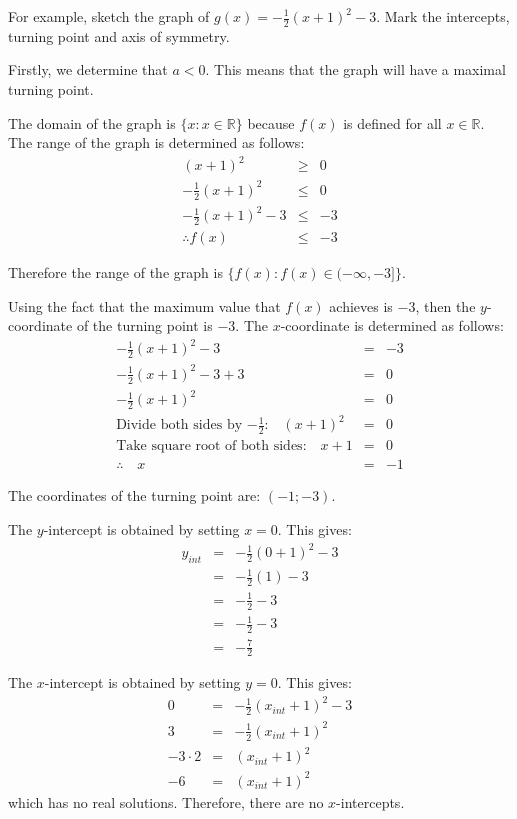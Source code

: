 For example, sketch the graph of $g(x)=-\frac{1}{2}(x+1)^2-3$. Mark the intercepts, turning point and axis of symmetry.

Firstly, we determine that $a<0$. This means that the graph will have a maximal turning point.

The domain of the graph is $\{x:x\in\mathbb{R}\}$ because $f(x)$ is defined for all $x\in \mathbb{R}$. The range of the graph is determined as follows:
\begin{eqnarray*}
(x+1)^2 &\ge& 0\\
-\frac{1}{2}(x+1)^2 &\le& 0\\
-\frac{1}{2}(x+1)^2-3 &\le& -3\\
\therefore f(x) &\le& -3
\end{eqnarray*}

Therefore the range of the graph is $\{f(x):f(x)\in(-\infty,-3]\}$.

Using the fact that the maximum value that $f(x)$ achieves is $-3$, then the $y$-coordinate of the turning point is $-3$. The $x$-coordinate is determined as follows:
\begin{eqnarray*}
-\frac{1}{2}(x+1)^2-3 &=& -3\\
-\frac{1}{2}(x+1)^2-3+3 &=& 0\\
-\frac{1}{2}(x+1)^2 &=& 0\\
\mbox{Divide both sides by $-\frac{1}{2}$:} \quad (x+1)^2 &=& 0\\
\mbox{Take square root of both sides:} \quad x+1 &=& 0\\
\therefore \quad x&=&-1
\end{eqnarray*}

The coordinates of the turning point are: $(-1;-3)$.

The $y$-intercept is obtained by setting $x=0$. This gives:
\begin{eqnarray*}
y_{int} &=&-\frac{1}{2}(0+1)^2-3\\
&=&-\frac{1}{2}(1)-3\\
&=&-\frac{1}{2}-3\\
&=&-\frac{1}{2}-3\\
&=&-\frac{7}{2}
\end{eqnarray*}

The $x$-intercept is obtained by setting $y=0$. This gives:
\begin{eqnarray*}
0 &=&-\frac{1}{2}(x_{int}+1)^2-3\\
3 &=&-\frac{1}{2}(x_{int}+1)^2\\
-3 \cdot 2 &=&(x_{int}+1)^2\\
-6 &=&(x_{int}+1)^2
\end{eqnarray*}
which has no real solutions. Therefore, there are no $x$-intercepts.

